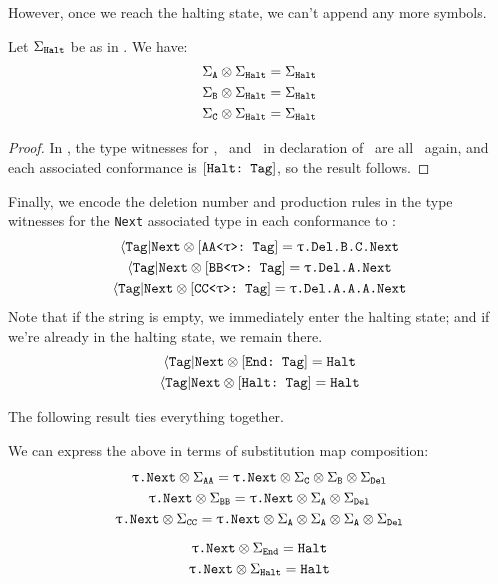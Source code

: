 \documentclass[../generics]{subfiles}
\begin{document}
However, once we reach the halting state, we can't append any more symbols.

\begin{lemma}\label{tag halt abc lemma}
Let $\Sigma_{\texttt{Halt}}$ be as in . We have:
\begin{gather*}
\Sigma_{\texttt{A}}\otimes\Sigma_{\texttt{Halt}}=\Sigma_{\texttt{Halt}}\\
\Sigma_{\texttt{B}}\otimes\Sigma_{\texttt{Halt}}=\Sigma_{\texttt{Halt}}\\
\Sigma_{\texttt{C}}\otimes\Sigma_{\texttt{Halt}}=\Sigma_{\texttt{Halt}}
\end{gather*}
\end{lemma}
\begin{proof}
In , the type witnesses for \nA, \nB\ and \nC\ in declaration of \Halt\ are all \Halt\ again, and each associated conformance is $[\texttt{Halt:~Tag}]$, so the result follows.
\end{proof}

Finally, we encode the deletion number and production rules in the type witnesses for the \texttt{Next} associated type in each conformance to \Tag:
\begin{gather*}
\langle\texttt{Tag}|\texttt{Next} \otimes [\texttt{AA<$\uptau$>:~Tag}] = \texttt{$\uptau$.Del.B.C.Next}\\
\langle\texttt{Tag}|\texttt{Next} \otimes [\texttt{BB<$\uptau$>:~Tag}] = \texttt{$\uptau$.Del.A.Next}\\
\langle\texttt{Tag}|\texttt{Next} \otimes [\texttt{CC<$\uptau$>:~Tag}] = \texttt{$\uptau$.Del.A.A.A.Next}
\end{gather*}
Note that if the string is empty, we immediately enter the halting state; and if we're already in the halting state, we remain there.
\begin{gather*}
\langle\texttt{Tag}|\texttt{Next} \otimes [\texttt{End:~Tag}] = \texttt{Halt}\\
\langle\texttt{Tag}|\texttt{Next} \otimes [\texttt{Halt:~Tag}] = \texttt{Halt}
\end{gather*}

The following result ties everything together.

\begin{lemma}\label{tag next lemma}
We can express the above in terms of substitution map composition:
\begin{gather*}
\texttt{$\uptau$.Next} \otimes \Sigma_{\texttt{AA}} = \texttt{$\uptau$.Next} \otimes \Sigma_{\texttt{C}} \otimes \Sigma_{\texttt{B}} \otimes \Sigma_{\texttt{Del}}\\
\texttt{$\uptau$.Next} \otimes \Sigma_{\texttt{BB}} = \texttt{$\uptau$.Next} \otimes \Sigma_{\texttt{A}} \otimes \Sigma_{\texttt{Del}}\\
\texttt{$\uptau$.Next} \otimes \Sigma_{\texttt{CC}} = \texttt{$\uptau$.Next} \otimes \Sigma_{\texttt{A}} \otimes \Sigma_{\texttt{A}} \otimes \Sigma_{\texttt{A}} \otimes \Sigma_{\texttt{Del}}\\[\medskipamount]
\texttt{$\uptau$.Next} \otimes \Sigma_{\texttt{End}} = \texttt{Halt}\\
\texttt{$\uptau$.Next} \otimes \Sigma_{\texttt{Halt}} = \texttt{Halt}
\end{gather*}
\end{lemma}
\end{document}
